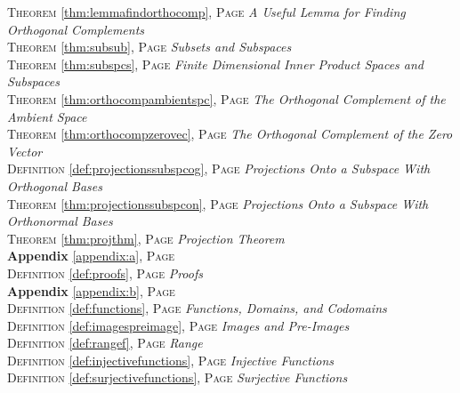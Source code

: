 \begin{multicols}{2}
{         \textsc{Theorem} \ref{thm:lemmafindorthocomp}, \textsc{Page} \pageref{thm:lemmafindorthocomp} \textit{A Useful Lemma for Finding Orthogonal Complements} \\
         \textsc{Theorem} \ref{thm:subsub}, \textsc{Page} \pageref{thm:subsub} \textit{Subsets and Subspaces} \\
         \textsc{Theorem} \ref{thm:subspcs}, \textsc{Page} \pageref{thm:subspcs} \textit{Finite Dimensional Inner Product Spaces and Subspaces} \\
         \textsc{Theorem} \ref{thm:orthocompambientspc}, \textsc{Page} \pageref{thm:orthocompambientspc} \textit{The Orthogonal Complement of the Ambient Space} \\
         \textsc{Theorem} \ref{thm:orthocompzerovec}, \textsc{Page} \pageref{thm:orthocompzerovec} \textit{The Orthogonal Complement of the Zero Vector} \\
         \textsc{Definition} \ref{def:projectionssubspcog}, \textsc{Page} \pageref{def:projectionssubspcog} \textit{Projections Onto a Subspace With Orthogonal Bases} \\
         \textsc{Theorem} \ref{thm:projectionssubspcon}, \textsc{Page} \pageref{thm:projectionssubspcon} \textit{Projections Onto a Subspace With Orthonormal Bases} \\
         \textsc{Theorem} \ref{thm:projthm}, \textsc{Page} \pageref{thm:projthm} \textit{Projection Theorem} \\
         \textbf{Appendix} \ref{appendix:a}, \textsc{Page} \pageref{appendix:a} \\
         \textsc{Definition} \ref{def:proofs}, \textsc{Page} \pageref{def:proofs} \textit{Proofs} \\
         \textbf{Appendix} \ref{appendix:b}, \textsc{Page} \pageref{appendix:b} \\
         \textsc{Definition} \ref{def:functions}, \textsc{Page} \pageref{def:functions} \textit{Functions, Domains, and Codomains} \\
         \textsc{Definition} \ref{def:imagespreimage}, \textsc{Page} \pageref{def:imagespreimage} \textit{Images and Pre-Images} \\
         \textsc{Definition} \ref{def:rangef}, \textsc{Page} \pageref{def:rangef} \textit{Range} \\
         \textsc{Definition} \ref{def:injectivefunctions}, \textsc{Page} \pageref{def:injectivefunctions} \textit{Injective Functions} \\
         \textsc{Definition} \ref{def:surjectivefunctions}, \textsc{Page} \pageref{def:surjectivefunctions} \textit{Surjective Functions} \\
}
\end{multicols}
